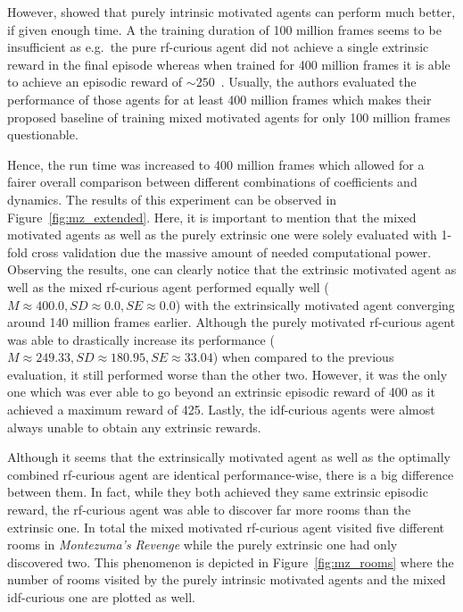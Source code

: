 \documentclass[draft,final]{vutinfth} %
\begin{document}
    However, \citet{burda_large-scale_2018-1} showed that purely intrinsic motivated agents can perform much better, if given enough time.
    A the training duration of 100 million frames seems to be insufficient as e.g.\ the pure \gls{rf}-curious agent did not achieve a single extrinsic reward in the final episode whereas when trained for 400 million frames it is able to achieve an episodic reward of $\sim250$~\citep[compare Figure 2]{burda_large-scale_2018-1}.
    Usually, the authors evaluated the performance of those agents for at least 400 million frames which makes their proposed baseline of training mixed motivated agents for only 100 million frames questionable.

    Hence, the run time was increased to 400 million frames which allowed for a fairer overall comparison between different combinations of coefficients and dynamics.
    The results of this experiment can be observed in Figure~\ref{fig:mz_extended}.
    Here, it is important to mention that the mixed motivated agents as well as the purely extrinsic one were solely evaluated with 1-fold cross validation due the massive amount of needed computational power.
    Observing the results, one can clearly notice that the extrinsic motivated agent as well as the mixed \gls{rf}-curious agent performed equally well ($M\approx400.0,SD\approx0.0,SE\approx0.0$) with the extrinsically motivated agent converging around 140 million frames earlier.
    Although the purely motivated \gls{rf}-curious agent was able to drastically increase its performance ($M\approx249.33,SD\approx180.95,SE\approx33.04$) when compared to the previous evaluation, it still performed worse than the other two.
    However, it was the only one which was ever able to go beyond an extrinsic episodic reward of 400 as it achieved a maximum reward of 425.
    Lastly, the \gls{idf}-curious agents were almost always unable to obtain any extrinsic rewards.

    Although it seems that the extrinsically motivated agent as well as the optimally combined \gls{rf}-curious agent are identical performance-wise, there is a big difference between them.
    In fact, while they both achieved they same extrinsic episodic reward, the \gls{rf}-curious agent was able to discover far more rooms than the extrinsic one.
    In total the mixed motivated \gls{rf}-curious agent visited five different rooms in \textit{Montezuma's Revenge} while the purely extrinsic one had only discovered two.
    This phenomenon is depicted in Figure~\ref{fig:mz_rooms} where the number of rooms visited by the purely intrinsic motivated agents and the mixed \gls{idf}-curious one are plotted as well.
\end{document}
